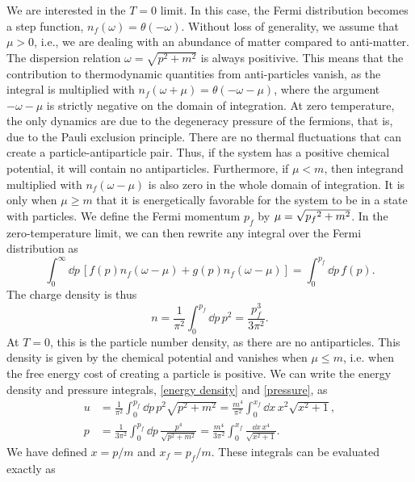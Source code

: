 We are interested in the $T = 0$ limit.
In this case, the Fermi distribution becomes a step function, $n_f(\omega) = \theta(-\omega)$.
Without loss of generality, we assume that $\mu > 0$, i.e., we are dealing with an abundance of matter compared to anti-matter.
The dispersion relation $\omega = \sqrt{p^2 + m^2}$ is always positivive.
This means that the contribution to thermodynamic quantities from anti-particles vanish, as the integral is multiplied with $n_f(\omega + \mu) = \theta(-\omega - \mu)$, where the argument $-\omega - \mu$ is strictly negative on the domain of integration.
At zero temperature, the only dynamics are due to the degeneracy pressure of the fermions, that is, due to the Pauli exclusion principle.
There are no thermal fluctuations that can create a particle-antiparticle pair.
Thus, if the system has a positive chemical potential, it will contain no antiparticles.
Furthermore, if $\mu< m$, then integrand multiplied with $n_f(\omega - \mu)$ is also zero in the whole domain of integration.
It is only when $\mu\geq m$ that it is energetically favorable for the system to be in a state with particles.
We define the Fermi momentum $p_f$ by $\mu = \sqrt{\smash{p_f}^2 + m^2}$. 
In the zero-temperature limit, we can then rewrite any integral over the Fermi distribution as
%
%
\begin{equation}
    \int_0^\infty \dd p \, [f(p) n_f(\omega - \mu) + g(p) n_f(\omega - \mu)]= \int_0^{p_f} \dd p \, f(p).
\end{equation}
%
The charge density is thus
%
\begin{equation}
    n = \frac{1}{\pi^2} \int_0^{p_f} \dd p\, p^2 = \frac{p_f^3}{3 \pi^2}.
\end{equation}
%
At $T = 0$, this is the particle number density, as there are no antiparticles.
This density is given by the chemical potential and vanishes when $\mu \leq m$, i.e. when the free energy cost of creating a particle is positive.
We can write the energy density and pressure integrals, \autoref{energy density} and \autoref{pressure}, as
%
\begin{align}
    u &= \frac{1}{\pi^2} \int_0^{p_f} \dd p \,
    p^2 \sqrt{p^2 + m^2}
    = \frac{m^4}{\pi^2} \int_0^{x_f} \dd x \, x^2 \sqrt{x^2 + 1}, \\
    p & = \frac{1}{3 \pi^2} \int_0^{p_f} \dd p \,  \frac{p^4}{\sqrt{p^2 + m^2}} 
    = \frac{m^4}{3 \pi^2} \int_0^{x_f} \frac{\dd x \, x^4}{\sqrt{x^2 + 1}}.
\end{align}
% 
We have defined $x = p / m$ and $x_f = p_f/m$.
These integrals can be evaluated exactly as
